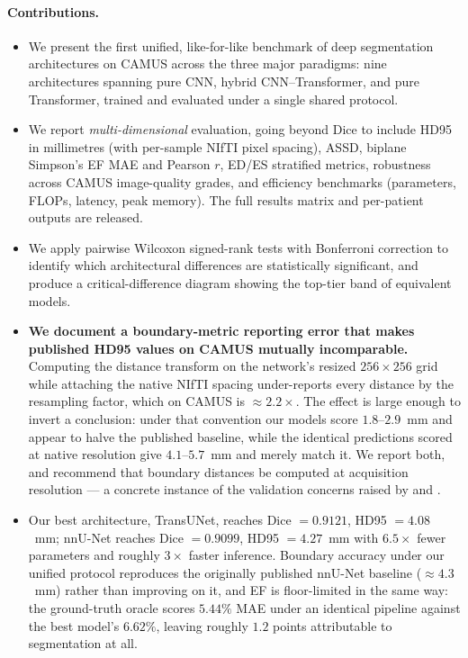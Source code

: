 \paragraph{Contributions.}
\begin{itemize}[leftmargin=*,nosep]
\item We present the first unified, like-for-like benchmark of deep
      segmentation architectures on CAMUS across the three major paradigms:
      nine architectures spanning pure CNN, hybrid CNN--Transformer, and
      pure Transformer, trained and evaluated under a single shared protocol.

\item We report \emph{multi-dimensional} evaluation, going beyond Dice
      to include HD95 in millimetres (with per-sample NIfTI pixel
      spacing), ASSD, biplane Simpson's EF MAE and Pearson $r$, ED/ES
      stratified metrics, robustness across CAMUS image-quality grades,
      and efficiency benchmarks (parameters, FLOPs, latency, peak
      memory). The full results matrix and per-patient outputs are
      released.

\item We apply pairwise Wilcoxon signed-rank tests with Bonferroni
      correction to identify which architectural differences are
      statistically significant, and produce a critical-difference
      diagram showing the top-tier band of equivalent models.

\item \textbf{We document a boundary-metric reporting error that makes
      published HD95 values on CAMUS mutually incomparable.} Computing
      the distance transform on the network's resized $256 \times 256$
      grid while attaching the native NIfTI spacing under-reports every
      distance by the resampling factor, which on CAMUS is
      $\approx 2.2\times$. The effect is large enough to invert a
      conclusion: under that convention our models score
      $1.8$--$2.9$~mm and appear to halve the published baseline, while
      the identical predictions scored at native resolution give
      $4.1$--$5.7$~mm and merely match it. We report both, and recommend
      that boundary distances be computed at acquisition resolution ---
      a concrete instance of the validation concerns raised by
      \citet{reinke2021limitations} and \citet{maierhein2024metrics}.

\item Our best architecture, TransUNet, reaches Dice $= 0.9121$,
      HD95 $= 4.08$~mm; nnU-Net reaches Dice $= 0.9099$, HD95 $= 4.27$~mm
      with $6.5\times$ fewer parameters and roughly $3\times$ faster
      inference. Boundary accuracy under our unified protocol reproduces
      the originally published nnU-Net baseline
      ($\approx 4.3$~mm) \citep{leclerc2019} rather than improving on it,
      and EF is floor-limited in the same way: the ground-truth oracle
      scores $5.44\%$ MAE under an identical pipeline against the best
      model's $6.62\%$, leaving roughly $1.2$ points attributable to
      segmentation at all.


\end{itemize}
